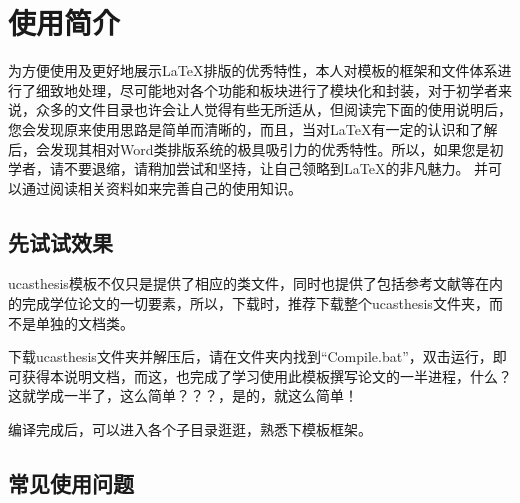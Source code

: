 
\chapter{使用简介}
\label{chap:guide}

为方便使用及更好地展示\LaTeX{}排版的优秀特性，本人对模板的框架和文件体系进行了细致地处理，尽可能地对各个功能和板块进行了模块化和封装，对于初学者来说，众多的文件目录也许会让人觉得有些无所适从，但阅读完下面的使用说明后，您会发现原来使用思路是简单而清晰的，而且，当对\LaTeX{}有一定的认识和了解后，会发现其相对Word类排版系统的极具吸引力的优秀特性。所以，如果您是初学者，请不要退缩，请稍加尝试和坚持，让自己领略到\LaTeX{}的非凡魅力。 并可以通过阅读相关资料如\citep{wikibook2014latex}来完善自己的使用知识。

\section{先试试效果}

ucasthesis模板不仅只是提供了相应的类文件，同时也提供了包括参考文献等在内的完成学位论文的一切要素，所以，下载时，推荐下载整个ucasthesis文件夹，而不是单独的文档类。

下载ucasthesis文件夹并解压后，请在文件夹内找到“Compile.bat”，双击运行，即可获得本说明文档，而这，也完成了学习使用此模板撰写论文的一半进程，什么？这就学成一半了，这么简单？？？，是的，就这么简单！

编译完成后，可以进入各个子目录逛逛，熟悉下模板框架。

\section{常见使用问题}

